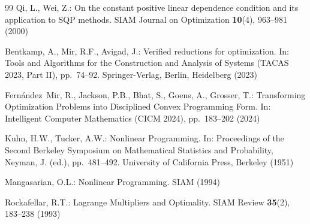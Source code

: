 \documentclass[sn-mathphys]{JORSC-jnl}%
\theoremstyle{thmstyleone}%
\theoremstyle{thmstylethree}%
\begin{document}
\begin{thebibliography}{99}
Qi, L., Wei, Z.:
On the constant positive linear dependence condition and its application to SQP methods.
SIAM Journal on Optimization \textbf{10}(4), 963--981 (2000)

Bentkamp, A., Mir, R.F., Avigad, J.:
Verified reductions for optimization.
In: Tools and Algorithms for the Construction and Analysis of Systems (TACAS 2023, Part II),
pp.~74--92. Springer-Verlag, Berlin, Heidelberg (2023)

Fern\'{a}ndez~Mir, R., Jackson, P.B., Bhat, S., Goens, A., Grosser, T.:
Transforming Optimization Problems into Disciplined Convex Programming Form.
In: Intelligent Computer Mathematics (CICM 2024), pp.~183--202 (2024)

Kuhn, H.W., Tucker, A.W.:
Nonlinear Programming.
In: Proceedings of the Second Berkeley Symposium on Mathematical Statistics and Probability,
Neyman, J. (ed.), pp.~481--492. University of California Press, Berkeley (1951)

Mangasarian, O.L.:
Nonlinear Programming.
SIAM (1994)

Rockafellar, R.T.:
Lagrange Multipliers and Optimality.
SIAM Review \textbf{35}(2), 183--238 (1993)

\end{thebibliography}
\end{document}
